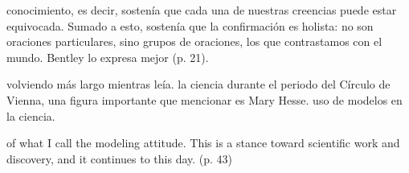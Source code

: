 conocimiento, es decir, sostenía que cada una de nuestras creencias puede
estar equivocada. Sumado a esto, sostenía que la confirmación es holista:
no son oraciones particulares, sino grupos de oraciones, los que
contrastamos con el mundo. Bentley lo expresa mejor  (p. 21).


volviendo más largo mientras leía. %
la ciencia durante el periodo del Círculo de Vienna, una figura importante
que mencionar es Mary Hesse. %
uso de modelos en la ciencia.


of what I call the modeling attitude. This is a stance toward scientific
work and discovery, and it continues to this day. (p. 43)
